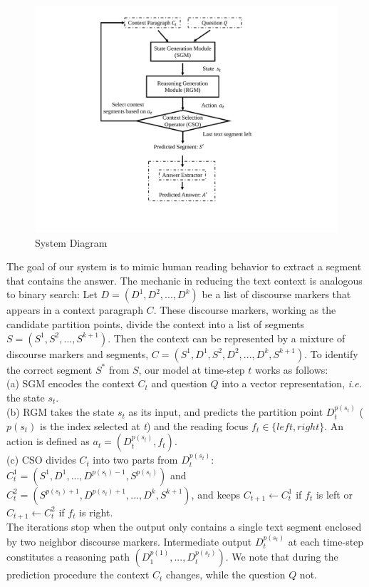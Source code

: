 \begin{figure}
\begin{minipage}{.45\textwidth}
 \centering
 \includegraphics[width=0.9\linewidth]{fig/fig1.pdf}
 \caption{System Diagram}
 \label{fig:systemDiagram}
\end{minipage}
\vspace{-2ex}
\end{figure}
\label{sec2description}
The goal of our system is to mimic human reading behavior to extract a segment that
contains the answer. The mechanic in reducing the text context is analogous to binary search: Let $D=(D^1,D^2,...,D^k)$ be a list of discourse markers that appears in a context paragraph $C$. These discourse markers, working as the candidate partition points, divide the context into a list of segments $S=(S^1,S^2,...,S^{k+1})$. Then the context can be represented by a mixture of discourse markers and segments, $C=(S^1, D^1, S^2, D^2,...,D^k, S^{k+1})$. To identify the correct segment $S^*$ from $S$, our model at time-step $t$ works as follows:\\
(a) SGM encodes the context $C_t$ and question $Q$ into a vector representation, \emph{i.e.} the state $s_t$.\\
(b) RGM takes the state $s_t$ as its input, and predicts the partition point $D^{p(s_t)}_t$ (${p(s_t)}$ is the index selected at \emph{t}) and the reading focus $f_t \in \{left, right\}$. An action is defined as $a_t=(D^{p(s_t)}_t,f_t)$. \\
(c) CSO divides $C_t$ into two parts from $D^{p(s_t)}_t$: $C^1_t=(S^1, D^1,...,D^{p(s_t)-1}, S^{p(s_t)})$ and $C^2_t=(S^{p(s_t)+1}, D^{p(s_t)+1},...,D^k, S^{k+1})$, and keeps $C_{t+1} \leftarrow C_{t}^{1}$ if $f_t$ is left or $C_{t+1} \leftarrow C_{t}^{2}$ if $f_t$ is right. \\
The iterations stop when the output only contains a single text segment enclosed by two neighbor discourse markers. Intermediate output $D^{p(s_t)}_t$ at each time-step constitutes a reasoning path $(D^{p(1)}_1,...,D^{p(s_t)}_t)$. We note that during the prediction procedure the context $C_t$ changes, while the question $Q$ not.

